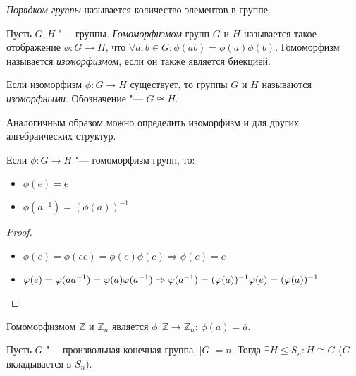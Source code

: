 \begin{definition}
	\textit{Порядком группы} называется количество элементов в группе.
\end{definition}

\begin{definition}
	Пусть $G, H$ "--- группы. \textit{Гомоморфизмом} групп $G$ и $H$ называется такое отображение $\phi : G \rightarrow H$, что $\forall a,b \in G: \phi(ab) = \phi(a)\phi(b)$. Гомоморфизм называется \textit{изоморфизмом}, если он также является биекцией.
	
	Если изоморфизм $\phi: G \rightarrow H$ существует, то группы $G$ и $H$ называются \textit{изоморфными}. Обозначение "--- $G \cong H$.
\end{definition}

\begin{note}
	Аналогичным образом можно определить изоморфизм и для других алгебраических структур.
\end{note}

\begin{proposition}
	Если $\phi: G \rightarrow H$ "--- гомоморфизм групп, то:
	\begin{itemize}
		\item $\phi(e) = e$
		\item $\phi(a^{-1}) = (\phi(a))^{-1}$
	\end{itemize}
\end{proposition}

\begin{proof}~
	\begin{itemize}
		\item $\phi(e) = \phi(ee) = \phi(e)\phi(e) \Rightarrow \phi(e) = e$
		\item $\phi(e) = \phi(aa^{-1}) = \phi(a)\phi(a^{-1}) \Rightarrow \phi(a^{-1}) = (\phi(a))^{-1}\phi(e) \hm{=} (\phi(a))^{-1}$
	\end{itemize}
\end{proof}

\begin{example}
	Гомоморфизмом $\mathbb{Z}$ и $\mathbb{Z}_n$ является $\phi: \mathbb{Z} \rightarrow \mathbb{Z}_n$: $\phi(a) = \overline{a}$.
\end{example}

\begin{theorem}[Кэли]
	Пусть $G$ "--- произвольная конечная группа, $|G| = n$. Тогда $\exists H \le S_n: H \cong G$ ($G$ вкладывается в $S_n$).
\end{theorem}

